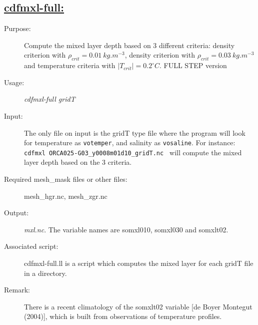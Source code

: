 \documentclass[a4paper,11pt]{article}
\begin{document}
\subsection*{\underline{cdfmxl-full:}}
\begin{description}
\item[Purpose:] Compute the mixed layer depth based on 3 different criteria: density criterion with $\rho_{crit}=0.01~kg.m^{-3}$,
density criterion with  $\rho_{crit}=0.03~kg.m^{-3}$ and temperature criteria with $ |T_{crit}|=0.2^\circ C $. FULL STEP version
\item[Usage:] {\em cdfmxl-full  gridT }\\
\item[Input:]  The only file on input is the gridT type file where the program will look for temperature as {\tt votemper},
and salinity as {\tt vosaline}.
For instance: {\tt cdfmxl   ORCA025-G03\_y0008m01d10\_gridT.nc } 
will compute  the mixed layer depth based on the 3 criteria.
\item[Required mesh\_mask files or other files:] mesh\_hgr.nc, mesh\_zgr.nc
\item[Output:] {\em mxl.nc}. The variable names are somxl010, somxl030 and somxlt02.
\item[Associated script:] cdfmxl-full.ll is a script which computes the mixed layer for each gridT file in a directory.
\item[Remark:] There is a  recent climatology of the somxlt02 variable [de Boyer Montegut \etal (2004)], which is built from
observations of temperature profiles. 
\end{description}


\newpage
\end{document}
